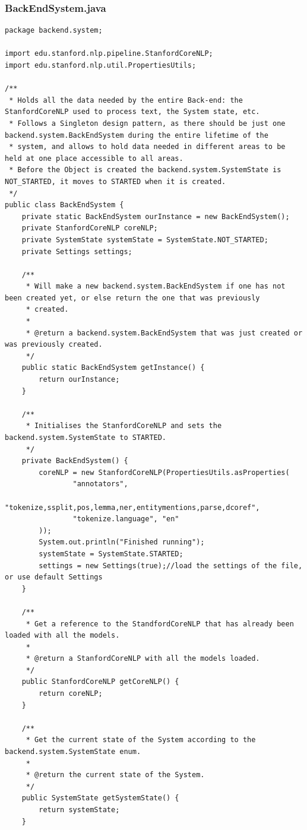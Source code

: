 \subsubsection{BackEndSystem.java}
\begin{lstlisting}
package backend.system;

import edu.stanford.nlp.pipeline.StanfordCoreNLP;
import edu.stanford.nlp.util.PropertiesUtils;

/**
 * Holds all the data needed by the entire Back-end: the StanfordCoreNLP used to process text, the System state, etc.
 * Follows a Singleton design pattern, as there should be just one backend.system.BackEndSystem during the entire lifetime of the
 * system, and allows to hold data needed in different areas to be held at one place accessible to all areas.
 * Before the Object is created the backend.system.SystemState is NOT_STARTED, it moves to STARTED when it is created.
 */
public class BackEndSystem {
    private static BackEndSystem ourInstance = new BackEndSystem();
    private StanfordCoreNLP coreNLP;
    private SystemState systemState = SystemState.NOT_STARTED;
    private Settings settings;

    /**
     * Will make a new backend.system.BackEndSystem if one has not been created yet, or else return the one that was previously
     * created.
     *
     * @return a backend.system.BackEndSystem that was just created or was previously created.
     */
    public static BackEndSystem getInstance() {
        return ourInstance;
    }

    /**
     * Initialises the StanfordCoreNLP and sets the backend.system.SystemState to STARTED.
     */
    private BackEndSystem() {
        coreNLP = new StanfordCoreNLP(PropertiesUtils.asProperties(
                "annotators",
                "tokenize,ssplit,pos,lemma,ner,entitymentions,parse,dcoref",
                "tokenize.language", "en"
        ));
        System.out.println("Finished running");
        systemState = SystemState.STARTED;
        settings = new Settings(true);//load the settings of the file, or use default Settings
    }

    /**
     * Get a reference to the StandfordCoreNLP that has already been loaded with all the models.
     *
     * @return a StanfordCoreNLP with all the models loaded.
     */
    public StanfordCoreNLP getCoreNLP() {
        return coreNLP;
    }

    /**
     * Get the current state of the System according to the backend.system.SystemState enum.
     *
     * @return the current state of the System.
     */
    public SystemState getSystemState() {
        return systemState;
    }


\end{lstlisting}
